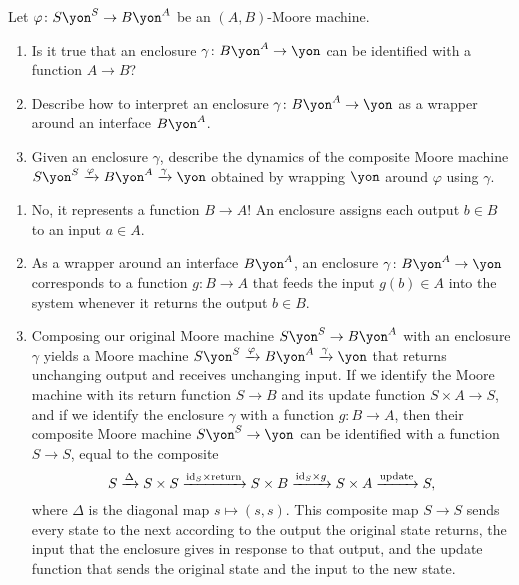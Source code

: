 \documentclass[Book-Poly]{subfiles}
\begin{document}
\begin{exercise} \label{exc.enclosures_as_functions}
Let $\varphi\colon S\yon^S\to B\yon^A$ be an $(A,B)$-Moore machine.
\begin{enumerate}
	\item Is it true that an enclosure $\gamma\colon B\yon^A\to\yon$ can be identified with a function $A\to B$?
	\item Describe how to interpret an enclosure $\gamma\colon B\yon^A\to\yon$ as a wrapper around an interface $B\yon^A$.
	\item Given an enclosure $\gamma$, describe the dynamics of the composite Moore machine $S\yon^S\To{\varphi}B\yon^A\To{\gamma}\yon$ obtained by wrapping $\yon$ around $\varphi$ using $\gamma$.
\qedhere
\end{enumerate}
\begin{solution}
\begin{enumerate}
	\item No, it represents a function $B\to A$!
	An enclosure assigns each output $b\in B$ to an input $a\in A$.
	\item As a wrapper around an interface $B\yon^A$, an enclosure $\gamma\colon B\yon^A\to\yon$ corresponds to a function $g\colon B\to A$ that feeds the input $g(b)\in A$ into the system whenever it returns the output $b\in B$.
	\item Composing our original Moore machine $S\yon^S\to B\yon^A$ with an enclosure $\gamma$ yields a Moore machine $S\yon^S\To{\varphi}B\yon^A\To{\gamma}\yon$ that returns unchanging output and receives unchanging input.
	If we identify the Moore machine with its return function $S\to B$ and its update function $S\times A\to S$, and if we identify the enclosure $\gamma$ with a function $g\colon B\to A$, then their composite Moore machine $S\yon^S\to\yon$ can be identified with a function $S\to S$, equal to the composite
	\[
	    S\xrightarrow{\Delta}S\times S\xrightarrow{\mathrm{id}_S\times\text{return}}S\times B\xrightarrow{\mathrm{id}_S\times g}S\times A\xrightarrow{\text{update}}S,
	\]
	where $\Delta$ is the diagonal map $s\mapsto(s,s)$.
	This composite map $S\to S$ sends every state to the next according to the output the original state returns, the input that the enclosure gives in response to that output, and the update function that sends the original state and the input to the new state.
\end{enumerate}
\end{solution}
\end{exercise}
\end{document}
